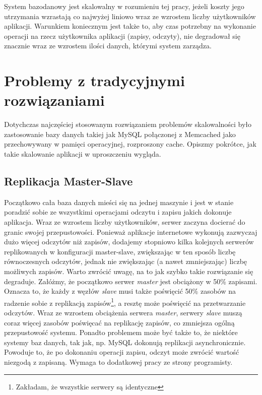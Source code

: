 System bazodanowy jest skalowalny w rozumieniu tej pracy, jeżeli koszty jego utrzymania wzrastają co najwyżej liniowo wraz ze wzrostem liczby użytkowników aplikacji. 
Warunkiem koniecznym jest także to, aby czas potrzebny na wykonanie operacji na rzecz użytkownika aplikacji (zapisy, odczyty), nie degradował się znacznie wraz ze wzrostem ilości danych, którymi system zarządza.

\section{Problemy z tradycyjnymi rozwiązaniami}
Dotychczas najczęściej stosowanym rozwiązaniem problemów skalowalności było zastosowanie bazy danych takiej jak MySQL połączonej z Memcached jako przechowywany w pamięci operacyjnej, rozproszony cache\cite{highscalability-mysql-end-of-an-era}.
Opiszmy pokrótce, jak takie skalowanie aplikacji w uproszczeniu wygląda.

\subsection{Replikacja Master-Slave}
Początkowo cała baza danych mieści się na jednej maszynie i jest w stanie poradzić sobie ze wszystkimi operacjami odczytu i zapisu jakich dokonuje aplikacja.
Wraz ze wzrostem liczby użytkowników, serwer zaczyna docierać do granic swojej przepustowości. 
Ponieważ aplikacje internetowe wykonują zazwyczaj dużo więcej odczytów niż zapisów, dodajemy stopniowo kilka kolejnych serwerów replikowanych w konfiguracji master-slave, zwiększając w ten sposób liczbę równoczesnych odczytów, jednak nie zwiększając (a nawet zmniejszając) liczbę możliwych zapisów.
Warto zwrócić uwagę, na to jak szybko takie rozwiązanie się degraduje.
Załóżmy, że początkowo serwer \emph{master} jest obciążony w 50\% zapisami.
Oznacza to, że każdy z węzłów \emph{slave} musi także poświęcić 50\% zasobów na radzenie sobie z replikacją zapisów\footnote{Zakładam, że wszystkie serwery są identyczne}, a resztę może poświęcić na przetwarzanie odczytów.
Wraz ze wzrostem obciążenia serwera \emph{master}, serwery \emph{slave} muszą coraz więcej zasobów poświęcać na replikację zapisów, co zmniejsza ogólną przepustowość systemu.
Ponadto problemem może być także to, że niektóre systemy baz danych, tak jak, np. MySQL dokonują replikacji asynchronicznie.
Powoduje to, że po dokonaniu operacji zapisu, odczyt może zwrócić wartość niezgodą z zapisaną.
Wymaga to dodatkowej pracy ze strony programisty\cite{zaitsev-scaling-mysql}.

